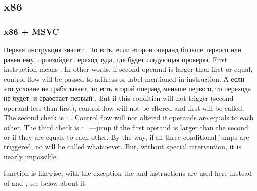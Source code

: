 ﻿\subsection{x86}

\subsubsection{x86 + MSVC}




\IFRU
{Первая инструкция \JLE значит . То есть, если второй операнд больше первого или 
равен ему, произойдет переход туда, где будет следующая проверка.}
{First instruction \JLE means . In other words, if second operand is 
larger than first or equal, control flow will be passed to address or label mentioned in instruction.}
\IFRU
{А если это условие не срабатывает, то есть второй операнд меньше первого, то перехода не будет, 
и сработает первый \printf.}
{But if this condition will not trigger (second operand less than first), control flow will 
not be altered and first \printf will be called.}
{The second check is \JNE: . Control flow will not altered if operands are 
equals to each other.}
{The third check is \JGE: ~---jump if the first operand is larger 
than the second or if they are equals to each other.}
{By the way, if all three conditional jumps are triggered, no \printf will be called whatsoever. 
But, without special intervention, it is nearly impossible.}

 
{function is likewise, with the exception the \JBE and \JAE instructions
are used here instead of 
\JLE and \JGE, see below about it:}

